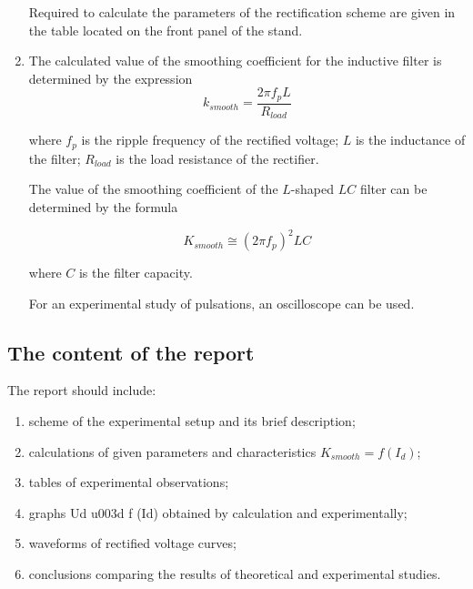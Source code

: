 \documentclass[a4paper,14pt]{article}
\begin{document}
\begin{enumerate}
Required to calculate the parameters of the rectification scheme are given in the table located on the front panel 
of the stand.

\item The calculated value of the smoothing coefficient for the inductive filter is determined by the expression
$$
		k_{smooth} = \frac{2\pi f_p L}{R_{load}}
$$


where $f_p$ is the ripple frequency of the rectified voltage; $L$ is the inductance of the filter;
$R_{load}$ is the load resistance of the rectifier.

The value of the smoothing coefficient of the $L$-shaped $LC$ filter can be determined by the formula

$$
K_{smooth} \cong (2\pi f_p)^2 LC
$$

where $C$ is the filter capacity.

For an experimental study of pulsations, an oscilloscope can be used.
\end{enumerate}

\subsection{The content of the report}

The report should include:
\begin{enumerate}
	\item scheme of the experimental setup and its brief description;
	\item calculations of given parameters and characteristics $K_{smooth} = f(I_d)$;
	\item tables of experimental observations;
	\item graphs Ud u003d f (Id) obtained by calculation and experimentally;
	\item waveforms of rectified voltage curves;
	\item conclusions comparing the results of theoretical and experimental studies.
\end{enumerate}
\end{document}
